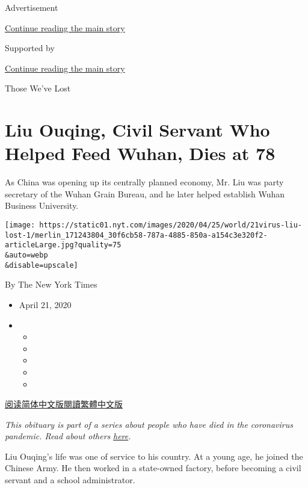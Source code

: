 Advertisement

\protect\hyperlink{after-top}{Continue reading the main story}

Supported by

\protect\hyperlink{after-sponsor}{Continue reading the main story}

Those We've Lost

\hypertarget{liu-ouqing-civil-servant-who-helped-feed-wuhan-dies-at-78}{%
\section{Liu Ouqing, Civil Servant Who Helped Feed Wuhan, Dies at
78}\label{liu-ouqing-civil-servant-who-helped-feed-wuhan-dies-at-78}}

As China was opening up its centrally planned economy, Mr. Liu was party
secretary of the Wuhan Grain Bureau, and he later helped establish Wuhan
Business University.

\texttt{[image: https://static01.nyt.com/images/2020/04/25/world/21virus-liu-lost-1/merlin\_171243804\_30f6cb58-787a-4885-850a-a154c3e320f2-articleLarge.jpg?quality=75\\\&auto=webp\\\&disable=upscale]}

By The New York Times

\begin{itemize}
\item
  April 21, 2020
\item
  \begin{itemize}
  \item
  \item
  \item
  \item
  \item
  \end{itemize}
\end{itemize}

\href{https://cn.nytimes.com/obits/20200423/ouqing-liu-coronavirus-dead/}{阅读简体中文版}\href{https://cn.nytimes.com/obits/20200423/ouqing-liu-coronavirus-dead/zh-hant/}{閱讀繁體中文版}

\emph{This obituary is part of a series about people who have died in
the coronavirus pandemic. Read about others}
\href{https://www.nytimes.com/series/people-who-have-died-of-the-coronavirus}{\emph{here}}\emph{.}

Liu Ouqing's life was one of service to his country. At a young age, he
joined the Chinese Army. He then worked in a state-owned factory, before
becoming a civil servant and a school administrator.


